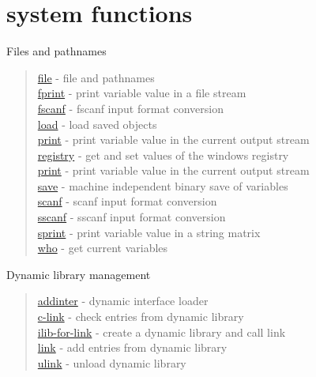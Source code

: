 \chapter*{system functions}

Files and pathnames
\begin{quote}
\noindent
\hyperlink{file}{file} - file and pathnames\\
\hyperlink{fprint}{fprint} - print variable value in a file stream\\
\hyperlink{fscanf}{fscanf} - fscanf input format conversion \\
\hyperlink{load}{load} - load saved objects\\
\hyperlink{print}{print} - print variable value  in the current output stream\\
\hyperlink{registry}{registry} - get and set values of the windows registry\\
\hyperlink{print}{print} - print variable value  in the current output stream\\
\hyperlink{save}{save} - machine independent binary save of variables\\
\hyperlink{scanf}{scanf} - scanf input format conversion \\
\hyperlink{sscanf}{sscanf} - sscanf input format conversion \\
\hyperlink{sprint}{sprint} - print variable value in a string matrix \\
\hyperlink{who}{who} - get current variables\\
\end{quote}

Dynamic library management
\begin{quote}
\noindent 
\hyperlink{addinter}{addinter} - dynamic interface loader\\
\hyperlink{c_link}{c-link} - check entries from dynamic library \\
\hyperlink{ilib_for_link}{ilib-for-link} - create a dynamic library and call link \\
\hyperlink{link}{link} - add entries from dynamic library \\
\hyperlink{ulink}{ulink} - unload dynamic library \\
\end{quote}



  
  

 
 

 
 
 
